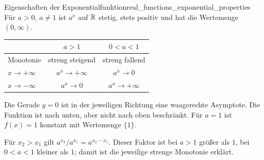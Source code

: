 \begin{TheoremBox}{Eigenschaften der Exponentialfunktion}{real_functions_exponential_properties}
  Für $a>0$, $a\ne1$ ist $a^x$ auf $\mathbb{R}$ stetig, stets positiv und
  hat die \textcolor{green!55!black}{Wertemenge} $(0,\infty)$.
  \begin{center}
    \renewcommand{\arraystretch}{1.4}
    \begin{tabular}{@{}lcc@{}}
      \toprule
       & $a>1$ & $0<a<1$\\ \midrule
      Monotonie & streng steigend & streng fallend\\
      $x\to+\infty$ & $a^x\to+\infty$ & $a^x\to0$\\
      $x\to-\infty$ & $a^x\to0$ & $a^x\to+\infty$\\
      \bottomrule
    \end{tabular}
  \end{center}
  Die Gerade $y=0$ ist in der jeweiligen Richtung eine waagerechte
  Asymptote. Die Funktion ist nach unten, aber nicht nach oben beschränkt.
  Für $a=1$ ist $f(x)=1$ konstant mit \textcolor{green!55!black}{Wertemenge} $\{1\}$.
\end{TheoremBox}
Für $x_2>x_1$ gilt $a^{x_2}/a^{x_1}=a^{x_2-x_1}$.
Dieser Faktor ist bei $a>1$ größer als $1$, bei $0<a<1$ kleiner als $1$;
damit ist die jeweilige strenge Monotonie erklärt.
